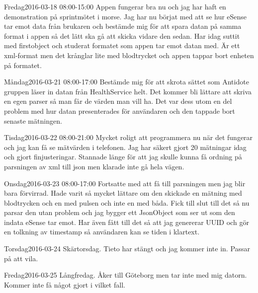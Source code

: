 \documentclass[a4paper,oneside]{book}
\begin{document}
\begin{diary}{Fredag}{2016-03-18 08:00-15:00}
	Appen fungerar bra nu och jag har haft en demonstration på sprintmötet i morse. Jag har nu börjat med att se hur eSense tar emot data från brukaren och bestämde mig för att spara datan på samma format i appen så det lätt ska gå att skicka vidare den sedan. Har idag suttit med firstobject och studerat formatet som appen tar emot datan med. Är ett xml-format men det krånglar lite med blodtrycket och appen tappar bort enheten på formatet.
\end{diary}
\newpage

\begin{diary}{Måndag}{2016-03-21 08:00-17:00}
	Bestämde mig för att skrota sättet som Antidote gruppen läser in datan från HealthService helt. Det kommer bli lättare att skriva en egen parser så man får de värden man vill ha. Det var dess utom en del problem med hur datan presenterades för användaren och den tappade bort senaste mätningen.
\end{diary}

\begin{diary}{Tisdag}{2016-03-22 08:00-21:00}
	Mycket roligt att programmera nu när det fungerar och jag kan få se mätvärden i telefonen. Jag har säkert gjort 20 mätningar idag och gjort finjusteringar. Stannade länge för att jag skulle kunna få ordning på parsningen av xml till json men klarade inte gå hela vägen.
\end{diary}

\begin{diary}{Onsdag}{2016-03-23 08:00-17:00}
	Fortsatte med att få till parsningen men jag blir bara förvirrad. Hade varit så mycket lättare om den skickade en mätning med blodtrycken och en med pulsen och inte en med båda. Fick till slut till det så nu parsar den utan problem och jag bygger ett JsonObject som ser ut som den indata eSense tar emot. Har även fått till det så att jag genererar UUID och gör en tolkning av timestamp så användaren kan se tiden i klartext.
\end{diary}

\begin{diary}{Torsdag}{2016-03-24}
	Skärtorsdag. Tieto har stängt och jag kommer inte in. Passar på att vila.
\end{diary}

\begin{diary}{Fredag}{2016-03-25}
	Långfredag. Åker till Göteborg men tar inte med mig datorn. Kommer inte få något gjort i vilket fall.
\end{diary}
\end{document}

